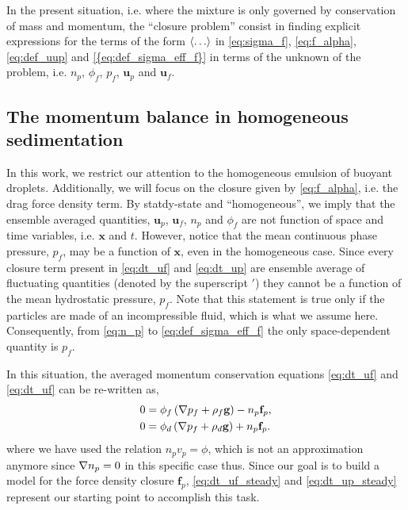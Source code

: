 In the present situation, i.e. where the mixture is only governed by conservation of mass and momentum,  the ``closure problem'' consist in finding explicit expressions for the terms of the form $\left<\ldots\right>$ in \ref{eq:sigma_f}, \ref{eq:f_alpha}, \ref{eq:def_uup} and \ref{{eq:def_sigma_eff_f}} in terms of the unknown of the problem, i.e. $n_p$, $\phi_f$, $p_f$, $\textbf{u}_p$ and $\textbf{u}_f$. 



\subsection{ The momentum balance in homogeneous sedimentation}

In this work, we restrict our attention to the homogeneous emulsion of buoyant droplets. 
Additionally, we will focus on the closure given by \ref{eq:f_alpha}, i.e. the drag force density term. 
By statdy-state and ``homogeneous'', we imply that the ensemble averaged quantities, $\textbf{u}_p$, $\textbf{u}_f$, $n_p$ and $\phi_f$ are not function of space and time variables, i.e. $\textbf{x}$ and $t$. 
However, notice that the mean continuous phase pressure, $p_f$, may be a function of $\textbf{x}$, even in the homogeneous case. 
Since every closure term present in \ref{eq:dt_uf} and \ref{eq:dt_up} are ensemble average of fluctuating quantities (denoted by the superscript $'$) they cannot be a function of the mean hydrostatic pressure, $p_f$.
Note that this statement is true only if the particles are made of an incompressible fluid, which is what we assume here. 
Consequently, from \ref{eq:n_p} to \ref{eq:def_sigma_eff_f} the only space-dependent quantity is $p_f$. 

In this situation, the averaged momentum conservation equations \ref{eq:dt_uf} and \ref{eq:dt_uf} can be re-written as, 
\begin{align}
    0 
    &= \phi_f 
    \left(\grad p_f
    + \rho_f \textbf{g}\right)
    - n_p \textbf{f}_p, 
    \label{eq:dt_uf_steady}
    \\
    0
    &= 
    \phi_d \left(\grad p_f
    + \rho_d \textbf{g}\right)
    + n_p \textbf{f}_p. 
    \label{eq:dt_up_steady}
\end{align}
where we have used the relation $n_p v_p = \phi$, which is not an approximation anymore since $\mathbf{\nabla} n_p = 0$ in this specific case thus.
Since our goal is to build a model for the force density closure $\textbf{f}_p$, \ref{eq:dt_uf_steady} and \ref{eq:dt_up_steady} represent our starting point to accomplish this task. 



